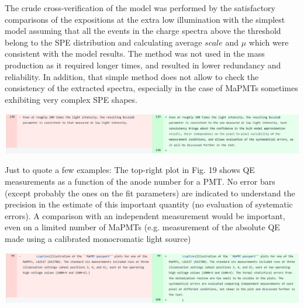 \documentclass[11pt]{report}
\begin{document}
The crude cross-verification of the model was performed by the satisfactory comparisons of the expositions at the extra low illumination with the simplest model assuming that all the events in the charge spectra above the threshold belong to the SPE distribution and calculating average $scale$ and $\mu$ which were consistent with the model results. The method was not used in the mass production as it required longer times, and resulted in lower redundancy and reliability. In addition, that simple method does not allow to check the consistency of the extracted spectra, especially in the case of MaPMTs sometimes exhibiting very complex SPE shapes.    


\includegraphics[width=\linewidth]{round1/2.09.png}



\begin{tcolorbox}[enlarge top by=2em,colbacktitle=black!60!white,colframe=black!80!white,left=0pt,right=0pt,top=0pt,bottom=0pt,boxrule=0.3pt,title=\bfseries2.09a]
Just to quote a few examples: The top-right plot in Fig. 19 shows QE measurements as a function of the anode number for a PMT. No error bars (except probably the ones on the fit parameters) are indicated to understand the precision in the estimate of this important quantity (no evaluation of systematic errors). A comparison with an independent measurement would be important, even on a limited number of MaPMTs (e.g. measurement of the absolute QE made using a calibrated monocromatic light source)
\end{tcolorbox}


\includegraphics[width=\linewidth]{round1/2.09a.png}
\end{document}
